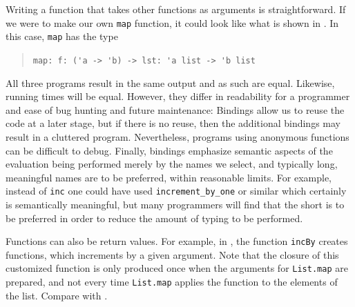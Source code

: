 \documentclass[fsharpNotes.tex]{subfiles}
\begin{document}
Writing a function that takes other functions as arguments is straightforward. If we were to make our own \lstinline{map} function, it could look like what is shown in .
%
%
In this case, \lstinline{map} has the type
\begin{quote}
  \lstinline{map: f: ('a -> 'b) -> lst: 'a list -> 'b list}
\end{quote}
All three programs result in the same output and as such are equal. Likewise, running times will be equal. However, they differ in readability for a programmer and ease of bug hunting and future maintenance: Bindings allow us to reuse the code at a later stage, but if there is no reuse, then the additional bindings may result in a cluttered program. Nevertheless, programs using anonymous functions can be difficult to debug. Finally, bindings emphasize semantic aspects of the evaluation being performed merely by the names we select, and typically long, meaningful names are to be preferred, within reasonable limits. For example, instead of \lstinline{inc} one could have used \lstinline{increment_by_one} or similar which certainly is semantically meaningful, but many programmers will find that the short is to be preferred in order to reduce the amount of typing to be performed.

Functions can also be return values. For example, in , the function \lstinline{incBy} creates functions, which increments by a given argument.
%
%
Note that the closure of this customized function is only produced once when the arguments for \lstinline{List.map} are prepared, and not every time \lstinline{List.map} applies the function to the elements of the list. Compare with .
\end{document}
